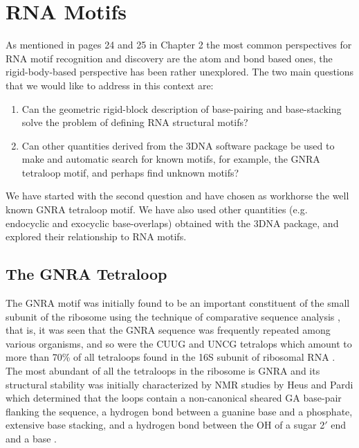 \chapter{RNA Motifs}
\label{motifs} 

As  mentioned  in  pages 24  and  25  in  Chapter  2 the  most  common
perspectives for RNA motif recognition  and discovery are the atom and
bond  based ones,  the  rigid-body-based perspective  has been  rather
unexplored.  The two  main questions that we would  like to address in
this context are:

\begin{enumerate}
\item{Can  the geometric rigid-block  description of  base-pairing and
  base-stacking solve the problem of defining RNA structural motifs?}
\item{Can other  quantities derived from the 3DNA  software package be
  used to make and automatic search for known motifs, for example, the
  GNRA tetraloop motif, and perhaps find unknown motifs?}
\end{enumerate}

We have started with the  second question and have chosen as workhorse
the  well  known  GNRA  tetraloop  motif.  We  have  also  used  other
quantities  (e.g.  endocyclic  and  exocyclic base-overlaps)  obtained
with  the  3DNA \cite{lu2003,  lu2008b}  package,  and explored  their
relationship to RNA motifs.

\section{The GNRA Tetraloop}
The GNRA motif  was initially found to be  an important constituent of
the small subunit  of the ribosome using the  technique of comparative
sequence analysis \cite{woese1990}, that is, it was seen that the GNRA
sequence was frequently repeated  among various organisms, and so were
the CUUG  and UNCG  tetralops which  amount to more  than 70\%  of all
tetraloops found in the 16S subunit of ribosomal RNA \cite{woese1990,
  depaul2010}.   The  most  abundant  of  all the  tetraloops  in  the
ribosome  is   GNRA  and   its  structural  stability   was  initially
characterized by NMR studies by  Heus and Pardi \cite {heus1991} which
determined that the loops contain a non-canonical sheared GA base-pair
flanking the  sequence, a hydrogen bond  between a guanine  base and a
phosphate, extensive base stacking, and a hydrogen bond between the OH
of a sugar 2$'$ end and a base \cite{heus1991}.

